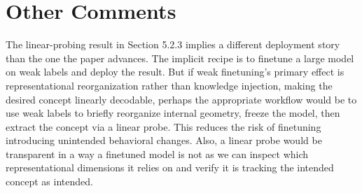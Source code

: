 \documentclass{article}
\begin{document}
\begin{enumerate}[leftmargin=*]
\begin{enumerate}[leftmargin=*]
\end{enumerate}

\section{Other Comments}

The linear-probing result in Section 5.2.3 implies a different deployment story than the one the paper advances. The implicit recipe is to finetune a large model on weak labels and deploy the result. But if weak finetuning's primary effect is representational reorganization rather than knowledge injection, making the desired concept linearly decodable, perhaps the appropriate workflow would be to use weak labels to briefly reorganize internal geometry, freeze the model, then extract the concept via a linear probe. This reduces the risk of finetuning introducing unintended behavioral changes. Also, a linear probe would be transparent in a way a finetuned model is not as we can inspect which representational dimensions it relies on and verify it is tracking the intended concept as intended.

% 
% 
\end{document}
